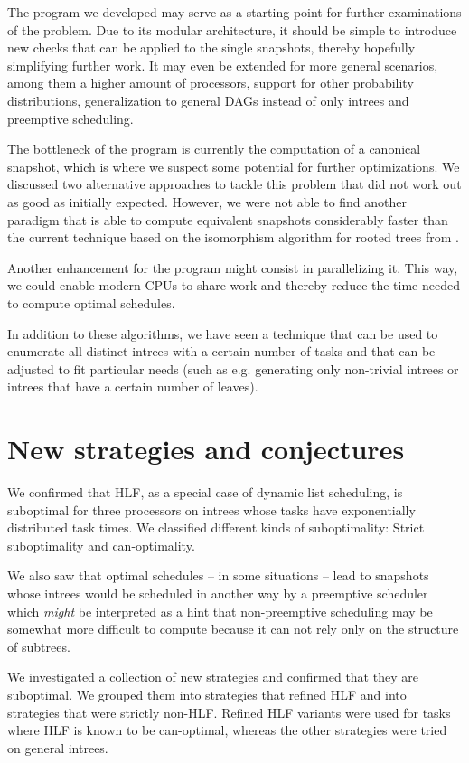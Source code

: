 The program we developed may serve as a starting point for further examinations of the problem. Due to its modular architecture, it should be simple to introduce new checks that can be applied to the single snapshots, thereby hopefully simplifying further work. It may even be extended for more general scenarios, among them a higher amount of processors, support for other probability distributions, generalization to general DAGs instead of only intrees and preemptive scheduling.

The bottleneck of the program is currently the computation of a canonical snapshot, which is where we suspect some potential for further optimizations. We discussed two alternative approaches to tackle this problem that did not work out as good as initially expected. However, we were not able to find another paradigm that is able to compute equivalent snapshots considerably faster than the current technique based on the isomorphism algorithm for rooted trees from \cite{aho1974design}.

Another enhancement for the program might consist in parallelizing it. This way, we could enable modern CPUs to share work and thereby reduce the time needed to compute optimal schedules.

In addition to these algorithms, we have seen a technique that can be used to enumerate all distinct intrees with a certain number of tasks and that can be adjusted to fit particular needs (such as e.g. generating only non-trivial intrees or intrees that have a certain number of leaves).

\section{New strategies and conjectures}
\label{sec:conclusion-strategies}

We confirmed that HLF, as a special case of dynamic list scheduling, is suboptimal for three processors on intrees whose tasks have exponentially distributed task times. We classified different kinds of suboptimality: Strict suboptimality and can-optimality.

We also saw that optimal schedules -- in some situations -- lead to snapshots whose intrees would be scheduled in another way by a preemptive scheduler which \emph{might} be interpreted as a hint that non-preemptive scheduling may be somewhat more difficult to compute because it can not rely only on the structure of subtrees.

We investigated a collection of new strategies and confirmed that they are suboptimal. We grouped them into strategies that refined HLF and into strategies that were strictly non-HLF. Refined HLF variants were used for tasks where HLF is known to be can-optimal, whereas the other strategies were tried on general intrees.

